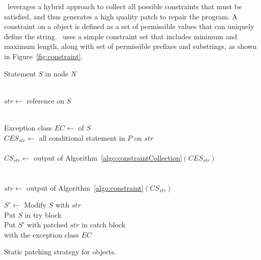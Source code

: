  \tool\ leverages a hybrid
approach to collect all possible constraints that must be satisfied, and thus
generates a high quality patch to repair the program. A constraint on a
 object is defined as a set of permissible values that can uniquely
define the string. \tool\ uses a simple constraint set that includes minimum and maximum
length, along with set of permissible prefixes and substrings, as shown in
Figure~\ref{fig:constraint}.

\begin{algorithm}[t]
\scriptsize
\DontPrintSemicolon
{}
\Begin
{
  {
  Statement $S$ in node $N$\\
   {\\
  	\mytab $str \longleftarrow$  reference on $S$
  	
  	 {\\
  	  \mytab Exception class $EC \longleftarrow$  of
$S$\\
          \mytab $CES_{str} \longleftarrow$ all conditional statement in $P$ on
$str$\\
 \mytab  {}\\
  	  \mytab $CS_{str} \longleftarrow$ output of
Algorithm~\ref{algo:constraintCollection}$(CES_{str})$\\

  		\mytab {} {\\
  		
  		 \mytab  {}\\
  			\mytab \mytab $str \longleftarrow$ output of
Algorithm~\ref{algo:constraint}$(CS_{str})$
  		}
  		
  		\mytab {}
  		
  		
  		\mytab $S'\longleftarrow$ Modify $S$ with $str$ \\
  		\mytab Put $S$ in try block\\
  		\mytab Put $S'$ with patched $str$ in catch block \\
  		\mytab with the exception class $EC$	
    }
    \vspace{-2em}
  }
 }
}
\caption{Static patching strategy for  objects.}
\label{algo:patchingStrategy}
\end{algorithm}


